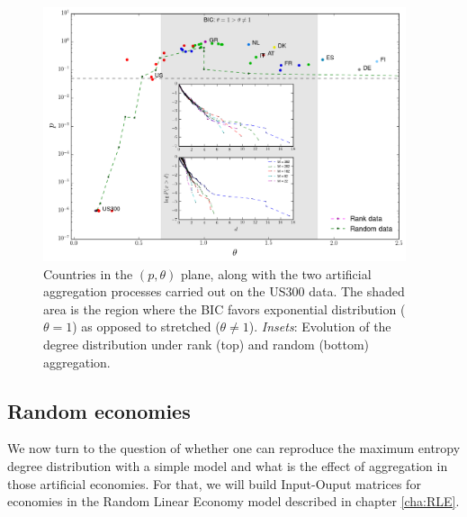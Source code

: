 \begin{figure}[!ht]
  \centering
  \includegraphics[width=0.95\textwidth]{figs_io/theta_pval_data_agg_w_inset.png}
  \caption{Countries in the $(p, \theta)$ plane, along with the two
    artificial aggregation processes carried out on the US300 data. The shaded
    area is the region where the BIC favors exponential distribution
    ($\theta = 1$) as opposed to stretched ($\theta \neq
    1$).
    \emph{Insets}: Evolution of the degree distribution under rank
    (top) and random (bottom) aggregation.}
  \label{fig:theta_pval_data}
\end{figure}

\subsection{Random economies}

We now turn to the question of whether one can reproduce the maximum entropy degree distribution with a simple model and what is the effect of aggregation in those artificial economies. For that, we will build Input-Ouput matrices for economies in the Random Linear Economy model described in chapter \ref{cha:RLE}.

